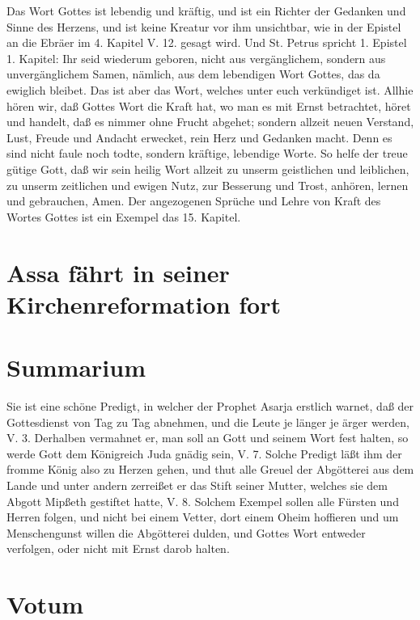 Das Wort Gottes ist lebendig und kräftig, und ist ein Richter der Gedanken und Sinne des Herzens, und ist keine Kreatur vor ihm unsichtbar, wie in der Epistel an die Ebräer im 4. Kapitel V. 12. gesagt wird. Und St. Petrus spricht 1. Epistel 1. Kapitel: Ihr seid wiederum geboren, nicht aus vergänglichem, sondern aus unvergänglichem Samen, nämlich, aus dem lebendigen Wort Gottes, das da ewiglich bleibet. Das ist aber das Wort, welches unter euch verkündiget ist. Allhie hören wir, daß Gottes Wort die Kraft hat, wo man es mit Ernst betrachtet, höret und handelt, daß es nimmer ohne Frucht abgehet; sondern allzeit neuen Verstand, Lust, Freude und Andacht erwecket, rein Herz und Gedanken macht. Denn es sind nicht faule noch todte, sondern kräftige, lebendige Worte. So helfe der treue gütige Gott, daß wir sein heilig Wort allzeit zu unserm geistlichen und leiblichen, zu unserm zeitlichen und ewigen Nutz, zur Besserung und Trost, anhören, lernen und gebrauchen, Amen. Der angezogenen Sprüche und Lehre von Kraft des Wortes Gottes ist ein Exempel das 15. Kapitel.

\section[Assa fährt in seiner Kirchenreformation fort]{Assa fährt in seiner Kirchenreformation fort}

\section{Summarium}

Sie ist eine schöne Predigt, in welcher der Prophet Asarja erstlich warnet, daß der Gottesdienst von Tag zu Tag abnehmen, und die Leute je länger je ärger werden, V. 3. Derhalben vermahnet er, man soll an Gott und seinem Wort fest halten, so werde Gott dem Königreich Juda gnädig sein, V. 7. Solche Predigt läßt ihm der fromme König also zu Herzen gehen, und thut alle Greuel der Abgötterei aus dem Lande und unter andern zerreißet er das Stift seiner Mutter, welches sie dem Abgott Mipßeth gestiftet hatte, V. 8. Solchem Exempel sollen alle Fürsten und Herren folgen, und nicht bei einem Vetter, dort einem Oheim hoffieren und um Menschengunst willen die Abgötterei dulden, und Gottes Wort entweder verfolgen, oder nicht mit Ernst darob halten.

\section{Votum}

